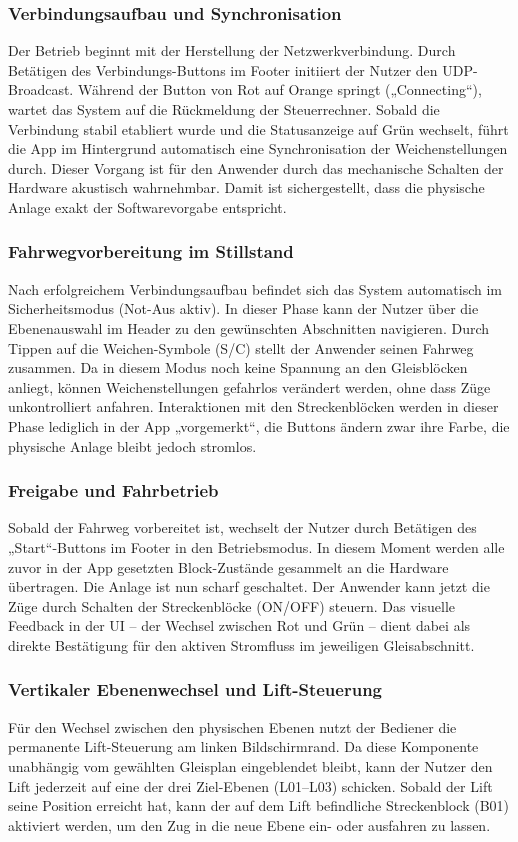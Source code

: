 \documentclass{article}
\begin{document}
\subsubsection{Verbindungsaufbau und Synchronisation}
Der Betrieb beginnt mit der Herstellung der Netzwerkverbindung.
Durch Betätigen des Verbindungs-Buttons im Footer initiiert der Nutzer den UDP-Broadcast.
Während der Button von Rot auf Orange springt („Connecting“), wartet das System auf die Rückmeldung der Steuerrechner.
Sobald die Verbindung stabil etabliert wurde und die Statusanzeige auf Grün wechselt, führt die App im Hintergrund automatisch eine Synchronisation der Weichenstellungen durch.
Dieser Vorgang ist für den Anwender durch das mechanische Schalten der Hardware akustisch wahrnehmbar.
Damit ist sichergestellt, dass die physische Anlage exakt der Softwarevorgabe entspricht.

\subsubsection{Fahrwegvorbereitung im Stillstand}
Nach erfolgreichem Verbindungsaufbau befindet sich das System automatisch im Sicherheitsmodus (Not-Aus aktiv).
In dieser Phase kann der Nutzer über die Ebenenauswahl im Header zu den gewünschten Abschnitten navigieren.
Durch Tippen auf die Weichen-Symbole (S/C) stellt der Anwender seinen Fahrweg zusammen.
Da in diesem Modus noch keine Spannung an den Gleisblöcken anliegt, können Weichenstellungen gefahrlos verändert werden, ohne dass Züge unkontrolliert anfahren.
Interaktionen mit den Streckenblöcken werden in dieser Phase lediglich in der App „vorgemerkt“, die Buttons ändern zwar ihre Farbe, die physische Anlage bleibt jedoch stromlos.

\subsubsection{Freigabe und Fahrbetrieb}
Sobald der Fahrweg vorbereitet ist, wechselt der Nutzer durch Betätigen des „Start“-Buttons im Footer in den Betriebsmodus.
In diesem Moment werden alle zuvor in der App gesetzten Block-Zustände gesammelt an die Hardware übertragen.
Die Anlage ist nun scharf geschaltet.
Der Anwender kann jetzt die Züge durch Schalten der Streckenblöcke (ON/OFF) steuern.
Das visuelle Feedback in der UI – der Wechsel zwischen Rot und Grün – dient dabei als direkte Bestätigung für den aktiven Stromfluss im jeweiligen Gleisabschnitt.

\subsubsection{Vertikaler Ebenenwechsel und Lift-Steuerung}
Für den Wechsel zwischen den physischen Ebenen nutzt der Bediener die permanente Lift-Steuerung am linken Bildschirmrand.
Da diese Komponente unabhängig vom gewählten Gleisplan eingeblendet bleibt, kann der Nutzer den Lift jederzeit auf eine der drei Ziel-Ebenen (L01–L03) schicken.
Sobald der Lift seine Position erreicht hat, kann der auf dem Lift befindliche Streckenblock (B01) aktiviert werden, um den Zug in die neue Ebene ein- oder ausfahren zu lassen.
\end{document}
